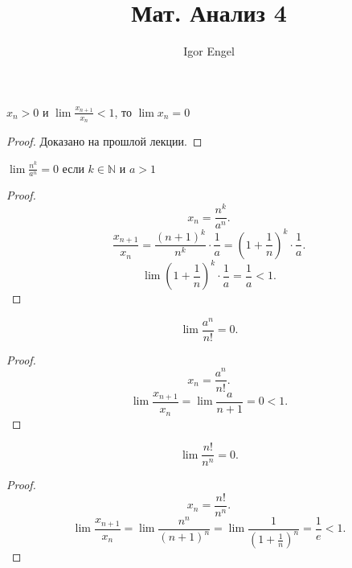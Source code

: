 \documentclass[11pt, oneside]{article}   	%
\title{Мат. Анализ 4}
\author{Igor Engel}
\date{}
\begin{document}
\maketitle
\section{}
    \begin{theorem}
        $x_n >0$ и  $\lim \frac{x_{n+1}}{x_n} < 1$, то $\lim x_n = 0$
        \begin{proof}
            Доказано на прошлой лекции.
        \end{proof}
    \end{theorem}    
    \begin{tlemma}
        $\lim \frac{n^{k}}{a^{n}}=0$ если $k\in \mathbb{N}$ и $a>1$
         \begin{proof}
             \[ x_n = \frac{n^{k}}{a^{n}} .\]
             \[ \frac{x_{n+1}}{x_n} = \frac{(n+1)^{k}}{n^{k}} \cdot \frac{1}{a} = \left(1+\frac{1}{n}\right)^{k} \cdot \frac{1}{a}.\]
         \[ \lim \left(1+\frac{1}{n}\right)^{k} \cdot \frac{1}{a} = \frac{1}{a} < 1  .\] 
        \end{proof}
    \end{tlemma}
    \begin{tlemma}
        \[ \lim \frac{a^{n}}{n!} = 0 .\]
        \begin{proof}
            \[ x_n = \frac{a^{n}}{n!} .\] 
            \[ \lim \frac{x_{n+1}}{x_n} = \lim \frac{a}{n+1} = 0 < 1.\] 
        \end{proof}
    \end{tlemma}
    \begin{tlemma}
        \[ \lim \frac{n!}{n^{n}} = 0 .\]
        \begin{proof}
            \[ x_n = \frac{n!}{n^{n}} .\]
            \[ \lim \frac{x_{n+1}}{x_n} = \lim \frac{n^{n}}{(n+1)^{n}} = \lim \frac{1}{(1+\frac{1}{n})^{n}} = \frac{1}{e} < 1 .\] 
        \end{proof}
    \end{tlemma}
\end{document}
